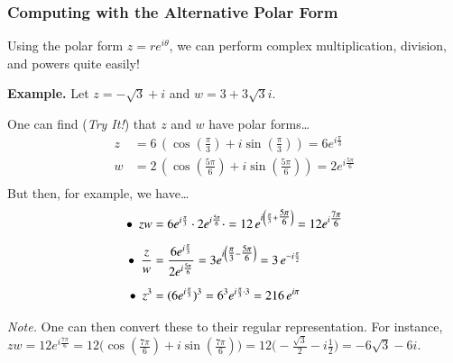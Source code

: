 \documentclass[12pt,xcolor={usenames,dvipsnames,x11names}]{beamer}
\begin{document}
\begin{frame}[t] \frametitle{\large Computing with the Alternative Polar Form}

\footnotesize Using the polar form $z= r e^{i \theta}$, we can perform complex multiplication, division, and powers quite easily! \par\vspace{0.3cm}

{\footnotesize\color{eblue} \bfseries Example.} Let $z= -\sqrt{3} + i$ and $w= 3 + 3 \sqrt{3} i$. \par\vspace{0.3cm}

One can find (\textit{Try It!}) that $z$ and $w$ have polar forms\dots
	\[
	\begin{aligned}
	z&= 6 \, \left( \cos \left( \tfrac{\pi}{3} \right) + i \sin \left( \tfrac{\pi}{3} \right) \right)= 6 e^{i \frac{\pi}{3}} \\[0.1cm]
	w&= 2 \, \left( \cos \left( \tfrac{5\pi}{6} \right) + i \sin \left( \tfrac{5\pi}{6} \right) \right)= 2 e^{i \frac{5\pi}{6}} \\
	\end{aligned}
	\]
But then, for example, we have\dots
	\[
	\begin{aligned}
	\text{\textbullet}\enskip zw&= 6 e^{i \frac{\pi}{3}} \cdot 2 e^{i \frac{5\pi}{6}} \cdot = 12\, e^{i \left( \frac{\pi}{3} + \tfrac{5\pi}{6} \right)}= 12 e^{i \tfrac{7\pi}{6}} \\[0.2cm]
	\text{\textbullet}\enskip \dfrac{z}{w}&= \dfrac{6 e^{i \frac{\pi}{3}}}{2 e^{i \frac{5\pi}{6}}}= 3 e^{i \left( \tfrac{\pi}{3} - \tfrac{5\pi}{6} \right)}= 3 \, e^{-i \frac{\pi}{2}} \\[0.2cm]
	\text{\textbullet}\enskip z^3&= (6 e^{i \frac{\pi}{3}})^3= 6^3 e^{i \frac{\pi}{3} \cdot 3}= 216\, e^{i \pi}
	\end{aligned}
	\]

{\scriptsize \textit{Note.} One can then convert these to their regular representation. For instance, $zw= 12 e^{i \frac{7\pi}{6}}= 12 \big(\cos(\tfrac{7\pi}{6}) + i \sin(\tfrac{7\pi}{6}) \big)= 12 \big(-\tfrac{\sqrt{3}}{2} - i\tfrac{1}{2} \big)= -6 \sqrt{3} - 6i$.}
\end{frame}
\end{document}
